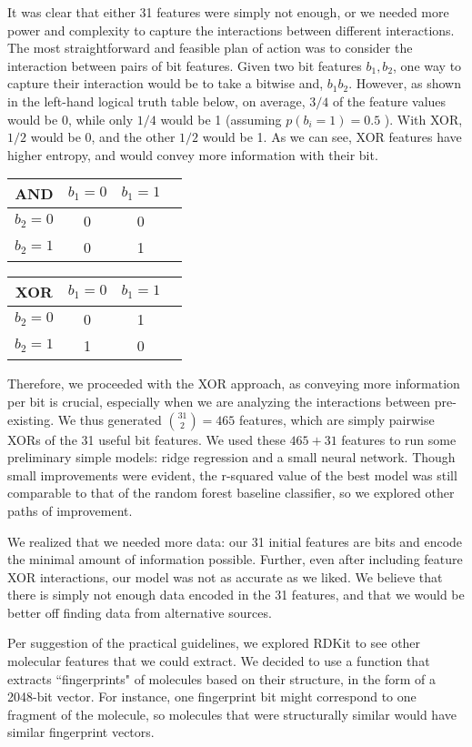 \documentclass[12pt]{article}
\begin{document}
It was clear that either 31 features were simply not enough, or we needed more power and complexity to capture the interactions between different interactions. The most straightforward and feasible plan of action was to consider the interaction between pairs of bit features. Given two bit features $b_1, b_2$, one way to capture their interaction would be to take a bitwise and, $b_1b_2$. However, as shown in the left-hand logical truth table below, on average, $3/4$ of the feature values would be 0, while only $1/4$ would be 1 (assuming $p(b_i=1) = 0.5$ ). With XOR, $1/2$ would be 0, and the other $1/2$ would be 1. As we can see, XOR features have higher entropy, and would convey more information with their bit. 

\begin{center}
\begin{tabular}{c|ccc}
AND & $b_1 = 0$ & $b_1 = 1$ &\\
\hline
$b_2 = 0$ & 0 & 0\\
$b_2 = 1$ & 0 & 1
\end{tabular}
\quad\quad
\begin{tabular}{c|ccc}
XOR & $b_1 = 0$ & $b_1 = 1$ &\\
\hline
$b_2 = 0$ & 0 & 1\\
$b_2 = 1$ & 1 & 0
\end{tabular}
\end{center}

Therefore, we proceeded with the XOR approach, as conveying more information per bit is crucial, especially when we are analyzing the interactions between pre-existing. We thus generated ${31 \choose 2} = 465$ features, which are simply pairwise XORs of the 31 useful bit features. We used these $465 + 31$ features to run some preliminary simple models: ridge regression and a small neural network. Though small improvements were evident, the r-squared value of the best model was still comparable to that of the random forest baseline classifier, so we explored other paths of improvement. 

We realized that we needed more data: our 31 initial features are bits and encode the minimal amount of information possible. Further, even after including feature XOR interactions, our model was not as accurate as we liked. We believe that there is simply not enough data encoded in the 31 features, and that we would be better off finding data from alternative sources. 

Per suggestion of the practical guidelines, we explored RDKit to see other molecular features that we could extract. We decided to use a function that extracts ``fingerprints" of molecules based on their structure, in the form of a 2048-bit vector. For instance, one fingerprint bit might correspond to one fragment of the molecule, so molecules that were structurally similar would have similar fingerprint vectors. 
\end{document}
